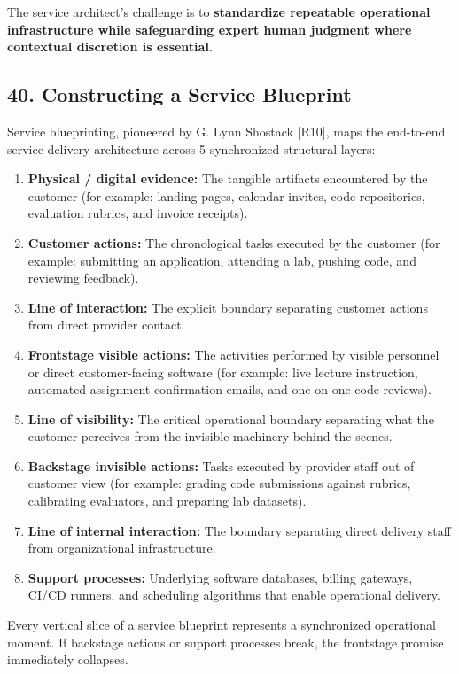 The service architect's challenge is to \textbf{standardize repeatable operational infrastructure while safeguarding expert human judgment where contextual discretion is essential}.

\subsection*{40. Constructing a Service Blueprint}

Service blueprinting, pioneered by G. Lynn Shostack [R10], maps the end-to-end service delivery architecture across 5 synchronized structural layers:
\begin{enumerate}
    \item \textbf{Physical / digital evidence:} The tangible artifacts encountered by the customer (for example: landing pages, calendar invites, code repositories, evaluation rubrics, and invoice receipts).
    \item \textbf{Customer actions:} The chronological tasks executed by the customer (for example: submitting an application, attending a lab, pushing code, and reviewing feedback).
    \item \textbf{Line of interaction:} The explicit boundary separating customer actions from direct provider contact.
    \item \textbf{Frontstage visible actions:} The activities performed by visible personnel or direct customer-facing software (for example: live lecture instruction, automated assignment confirmation emails, and one-on-one code reviews).
    \item \textbf{Line of visibility:} The critical operational boundary separating what the customer perceives from the invisible machinery behind the scenes.
    \item \textbf{Backstage invisible actions:} Tasks executed by provider staff out of customer view (for example: grading code submissions against rubrics, calibrating evaluators, and preparing lab datasets).
    \item \textbf{Line of internal interaction:} The boundary separating direct delivery staff from organizational infrastructure.
    \item \textbf{Support processes:} Underlying software databases, billing gateways, CI/CD runners, and scheduling algorithms that enable operational delivery.
\end{enumerate}

Every vertical slice of a service blueprint represents a synchronized operational moment. If backstage actions or support processes break, the frontstage promise immediately collapses.

